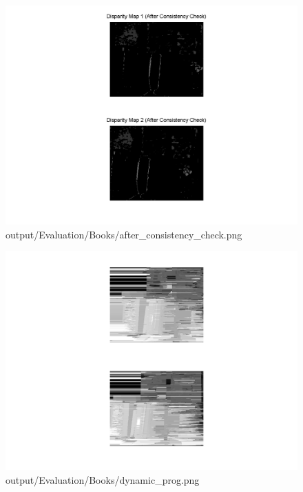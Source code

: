 \begin{figure}[h]    \includegraphics[scale=0.5]{output/Evaluation/Books/after_consistency_check.png}    \caption{output/Evaluation/Books/after\_consistency\_check.png}\end{figure}
\begin{figure}[h]    \includegraphics[scale=0.5]{output/Evaluation/Books/dynamic_prog.png}    \caption{output/Evaluation/Books/dynamic\_prog.png}\end{figure}
